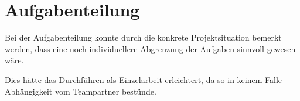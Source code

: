 \section{Aufgabenteilung}

Bei der Aufgabenteilung konnte durch die konkrete Projektsituation bemerkt werden, dass eine noch individuellere Abgrenzung der Aufgaben sinnvoll gewesen wäre.

Dies hätte das Durchführen als Einzelarbeit erleichtert, da so in keinem Falle Abhängigkeit vom Teampartner bestünde.